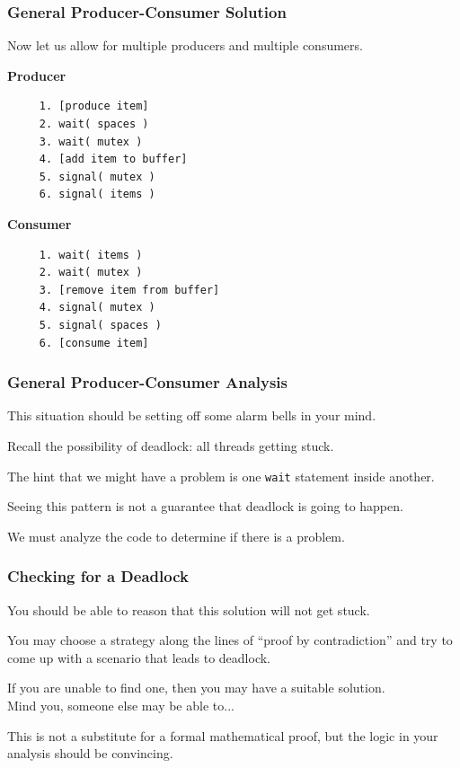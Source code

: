 \begin{frame}[fragile]
\frametitle{General Producer-Consumer Solution}

Now let us allow for multiple producers and multiple consumers.

\begin{multicols}{2}
\textbf{Producer}
  \begin{verbatim}
	 1. [produce item]
	 2. wait( spaces )
	 3. wait( mutex )
	 4. [add item to buffer]
	 5. signal( mutex )
	 6. signal( items )
  \end{verbatim}
\columnbreak
\textbf{Consumer}
  \begin{verbatim}
	 1. wait( items )
	 2. wait( mutex )
	 3. [remove item from buffer]
	 4. signal( mutex )
	 5. signal( spaces )
	 6. [consume item]
  \end{verbatim}
\end{multicols}


\end{frame}



\begin{frame}
\frametitle{General Producer-Consumer Analysis}

This situation should be setting off some alarm bells in your mind. 

Recall the possibility of deadlock: all threads getting stuck.

The hint that we might have a problem is one \texttt{wait} statement inside another.

Seeing this pattern is not a guarantee that deadlock is going to happen.

We must analyze the code to determine if there is a problem. 


\end{frame}



\begin{frame}
\frametitle{Checking for a Deadlock}

You should be able to reason that this solution will not get stuck.

 You may choose a strategy along the lines of ``proof by contradiction'' and try to come up with a scenario that leads to deadlock. 
 
 If you are unable to find one, then you may have a suitable solution.\\
 \quad Mind you, someone else may be able to...
 
 This is not a substitute for a formal mathematical proof, but the logic in your analysis should be convincing.
\end{frame}



